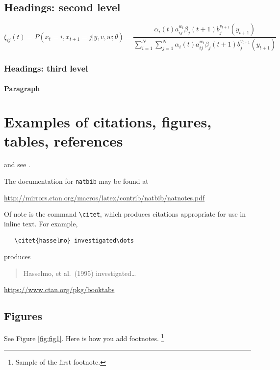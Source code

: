 \documentclass{article}
\begin{document}
\subsection{Headings: second level}
\lipsum[5]
\begin{equation}
  \xi _{ij}(t)=P(x_{t}=i,x_{t+1}=j|y,v,w;\theta)= {\frac {\alpha _{i}(t)a^{w_t}_{ij}\beta _{j}(t+1)b^{v_{t+1}}_{j}(y_{t+1})}{\sum _{i=1}^{N} \sum _{j=1}^{N} \alpha _{i}(t)a^{w_t}_{ij}\beta _{j}(t+1)b^{v_{t+1}}_{j}(y_{t+1})}}
\end{equation}

\subsubsection{Headings: third level}
\lipsum[6]

\paragraph{Paragraph}
\lipsum[7]

\section{Examples of citations, figures, tables, references}
\label{sec:others}
\lipsum[8] \cite{kour2014real,kour2014fast} and see \cite{hadash2018estimate}.

The documentation for \verb+natbib+ may be found at
\begin{center}
  \url{http://mirrors.ctan.org/macros/latex/contrib/natbib/natnotes.pdf}
\end{center}
Of note is the command \verb+\citet+, which produces citations
appropriate for use in inline text.  For example,
\begin{verbatim}
   \citet{hasselmo} investigated\dots
\end{verbatim}
produces
\begin{quote}
  Hasselmo, et al.\ (1995) investigated\dots
\end{quote}

\begin{center}
  \url{https://www.ctan.org/pkg/booktabs}
\end{center}


\subsection{Figures}
\lipsum[10]
See Figure \ref{fig:fig1}. Here is how you add footnotes. \footnote{Sample of the first footnote.}
\lipsum[11]
\end{document}
